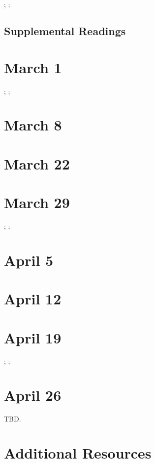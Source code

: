 \documentclass[11pt]{article}
\begin{document}
\cite{Nakamura:2014gp}; \cite{Ensmenger:2010tc}; \cite{Haraway:1991uz}


\subsection{Supplemental Readings}

\cite{Ensmenger:2012vq}


\section{March 1}

\cite[][(selected excerpts)]{Levy:1984ut}; \cite{Eglash:2002wk}; \cite{Lagesen:2008vy}


\section{March 8}

\cite{Hayles:2008wq}


\section{March 22}

\cite{Pascoe:2011cj}

\section{March 29}

\cite{Cohn:1993wq}; \cite{Nafus:2012gg}; \cite{Reagle:2012vr}


\section{April 5 }

\cite{Cassell:2000vw}


\section{April 12}

\cite{Kafai:2008wl}



\section{April 19}

\cite{Gaboury:2015uv}; \cite{Nooney:2013vu}; \cite{Wu:2007gs}



\section{April 26}

TBD.

\newpage
\section{Additional Resources}
\nocite{*} 
\printbibliography
\end{document}
